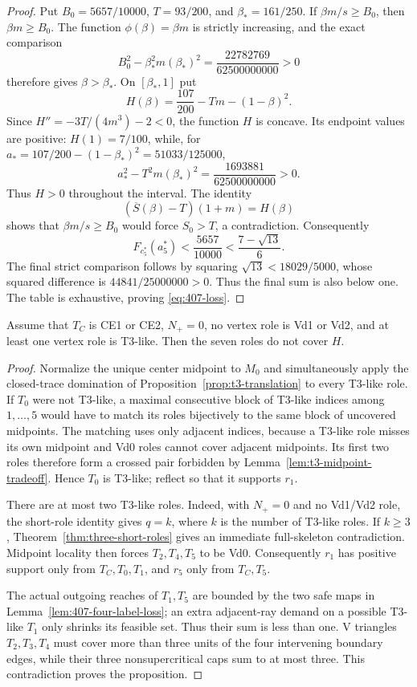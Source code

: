 \begin{proof}
Put $B_0=5657/10000$, $T=93/200$, and $\beta_*=161/250$.
If $\beta m/s\ge B_0$, then $\beta m\ge B_0$.  The function
$\phi(\beta)=\beta m$ is strictly increasing, and the exact comparison
\[
 B_0^2-\beta_*^2m(\beta_*)^2
 =\frac{22782769}{62500000000}>0
\]
therefore gives $\beta>\beta_*$.  On $[\beta_*,1]$ put
\[
 H(\beta)=\frac{107}{200}-Tm-(1-\beta)^2.
\]
Since $H''=-3T/(4m^3)-2<0$, the function $H$ is concave.  Its endpoint
values are positive: $H(1)=7/100$, while, for
$a_*=107/200-(1-\beta_*)^2=51033/125000$,
\[
 a_*^2-T^2m(\beta_*)^2
 =\frac{1693881}{62500000000}>0.
\]
Thus $H>0$ throughout the interval.  The identity
\[
 (\overline S(\beta)-T)(1+m)=H(\beta)
\]
shows that $\beta m/s\ge B_0$ would force $S_0>T$, a contradiction.
Consequently
\[
 F_{c_5^\ast}(a_5^\ast)<\frac{5657}{10000}
 <\frac{7-\sqrt{13}}6.
\]
The final strict comparison follows by squaring
$\sqrt{13}<18029/5000$, whose squared difference is
$44841/25000000>0$.
Thus the final sum is also below one.  The table is exhaustive, proving
\eqref{eq:407-loss}.
\end{proof}

\begin{proposition}[The $N_+=0$ T3-like branch]
\label{prop:nplus-zero-t3}
Assume that $T_C$ is CE1 or CE2, $N_+=0$, no vertex role is Vd1 or Vd2,
and at least one vertex role is T3-like.  Then the seven roles do not cover
$H$.
\end{proposition}

\begin{proof}
Normalize the unique center midpoint to $M_0$ and simultaneously apply the
closed-trace domination of Proposition~\ref{prop:t3-translation} to every
T3-like role.  If $T_0$ were not T3-like, a maximal consecutive block of
T3-like indices among $1,\ldots,5$ would have to match its roles bijectively
to the same block of uncovered midpoints.  The matching uses only adjacent
indices, because a T3-like role misses its own midpoint and Vd0 roles cannot
cover adjacent midpoints.  Its first two roles therefore form a crossed pair
forbidden by Lemma~\ref{lem:t3-midpoint-tradeoff}.  Hence $T_0$ is T3-like;
reflect so that it supports $r_1$.

There are at most two T3-like roles.  Indeed, with $N_+=0$ and no
Vd1/Vd2 role, the short-role identity gives $q=k$, where $k$ is the number
of T3-like roles.  If $k\ge3$, Theorem~\ref{thm:three-short-roles} gives an
immediate full-skeleton contradiction.
Midpoint locality then forces $T_2,T_4,T_5$ to be Vd0.  Consequently $r_1$
has positive support only from $T_C,T_0,T_1$, and $r_5$ only from $T_C,T_5$.

The actual outgoing reaches of $T_1,T_5$ are bounded by the two safe maps in
Lemma~\ref{lem:407-four-label-loss}; an extra adjacent-ray demand on a
possible T3-like $T_1$ only shrinks its feasible set.  Thus their sum is
less than one.  V triangles $T_2,T_3,T_4$ must cover more than three units of the
four intervening boundary edges, while their three nonsupercritical caps
sum to at most three.  This contradiction proves the proposition.
\end{proof}

